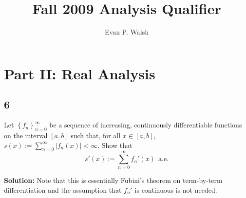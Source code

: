 \documentclass[12pt]{article}
\title{Fall 2009 Analysis Qualifier}
\author{Evan P. Walsh}
\begin{document}

\section*{Part II: Real Analysis}

\subsection*{6}
Let $\left\{ f_{n} \right\}_{n=0}^{\infty}$ be a sequence of increasing, continuously differentiable functions on the interval $[a,b]$ such that, for
all $x \in [a,b]$, $s(x) := \sum_{n=0}^{\infty}|f_{n}(x)| < \infty$.
Show that 
\[ s'(x) := \sum_{n=0}^{\infty}f_{n}'(x)\ \ \text{a.e.} \]

{\bf Solution:} Note that this is essentially Fubini's theorem on term-by-term differentiation and the assumption that $f_{n}'$ is continuous is not
needed.
\end{document}
